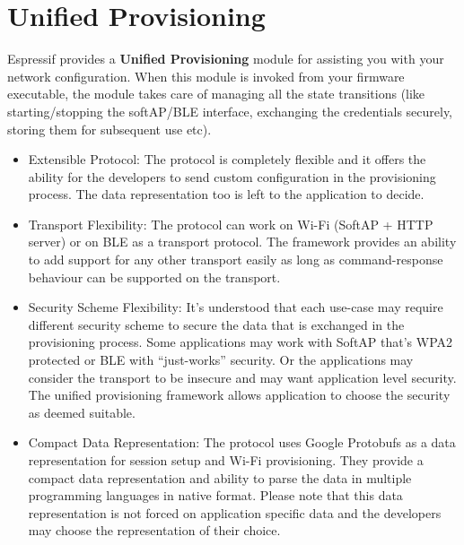 \documentclass[main.tex]{subfiles}
\begin{document}
 
\section{Unified Provisioning}\label{sec:unified_prov}

Espressif provides a \textbf{Unified Provisioning} module for assisting you with your network configuration. When this module is invoked from your firmware executable, the module takes care of managing all the state transitions (like starting/stopping the softAP/BLE interface, exchanging the credentials securely, storing them for subsequent use etc).

\begin{itemize}

\item Extensible Protocol: The protocol is completely flexible and it offers the ability for the developers to send custom configuration in the provisioning process. The data representation too is left to the application to decide.
\item Transport Flexibility: The protocol can work on Wi-Fi (SoftAP + HTTP server) or on BLE as a transport protocol. The framework provides an ability to add support for any other transport easily as long as command-response behaviour can be supported on the transport.
\item Security Scheme Flexibility: It’s understood that each use-case may require different security scheme to secure the data that is exchanged in the provisioning process. Some applications may work with SoftAP that’s WPA2 protected or BLE with “just-works” security. Or the applications may consider the transport to be insecure and may want application level security. The unified provisioning framework allows application to choose the security as deemed suitable.
\item Compact Data Representation: The protocol uses Google Protobufs as a data representation for session setup and Wi-Fi provisioning. They provide a compact data representation and ability to parse the data in multiple programming languages in native format. Please note that this data representation is not forced on application specific data and the developers may choose the representation of their choice.

\end{itemize}

\end{document}

